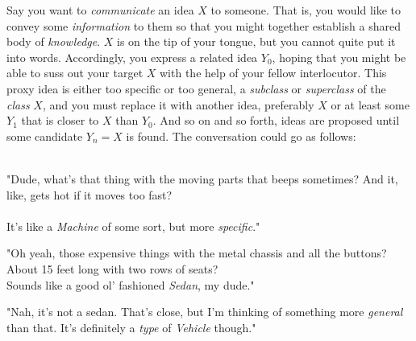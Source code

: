 
Say you want to \textit{communicate} an idea $X$ to someone. That is, you would like to convey some \textit{information} to them so that you might together establish a shared body of \textit{knowledge}. $X$ is on the tip of your tongue, but you cannot quite put it into words. Accordingly, you express a related idea $Y_0$, hoping that you might be able to suss out your target $X$ with the help of your fellow interlocutor. This proxy idea is either too specific or too general, a \textit{subclass} or \textit{superclass} of the \textit{class} $X$, and you must replace it with another idea, preferably $X$ or at least some $Y_1$ that is closer to $X$ than $Y_0$. And so on and so forth, ideas are proposed until some candidate $Y_n=X$ is found. The conversation could go as follows: \\\\

\begin{addmargin}[8em]{2em}
\begin{flushright}
"Dude, what's that thing with the moving parts that beeps sometimes? And it, like, gets hot if it moves too fast? \\[1mm]

\mydots \\[1mm]

It's like a \textit{Machine} of some sort, but more \textit{specific}." \\[\baselineskip]
\end{flushright}
\end{addmargin}

\begin{addmargin}[2em]{8em}
"Oh yeah, those expensive things with the metal chassis and all the buttons? About 15 feet long with two rows of seats? \\[2mm]
Sounds like a good ol' fashioned \textit{Sedan}, my dude." \\
\end{addmargin}

\begin{addmargin}[8em]{2em}
	\begin{flushright}
		"Nah, it's not a sedan. That's close, but I'm thinking of something more \textit{general} than that. It's definitely a \textit{type} of \textit{Vehicle} though." \\[\baselineskip]
	\end{flushright}
\end{addmargin}

